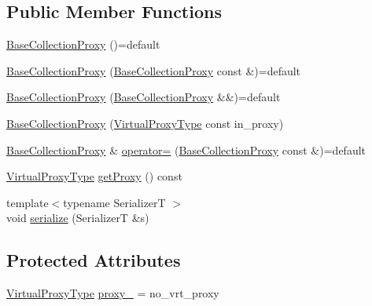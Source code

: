 \subsection*{Public Member Functions}
\begin{DoxyCompactItemize}
\item 
\hyperlink{structvt_1_1vrt_1_1collection_1_1_base_collection_proxy_ac2b876c6fb01d7e39da1ab6a50f05ba4}{Base\+Collection\+Proxy} ()=default
\item 
\hyperlink{structvt_1_1vrt_1_1collection_1_1_base_collection_proxy_a60b492b42645010e757895f5552e55df}{Base\+Collection\+Proxy} (\hyperlink{structvt_1_1vrt_1_1collection_1_1_base_collection_proxy}{Base\+Collection\+Proxy} const \&)=default
\item 
\hyperlink{structvt_1_1vrt_1_1collection_1_1_base_collection_proxy_a440dfc879237bd36076529c8da0ffca8}{Base\+Collection\+Proxy} (\hyperlink{structvt_1_1vrt_1_1collection_1_1_base_collection_proxy}{Base\+Collection\+Proxy} \&\&)=default
\item 
\hyperlink{structvt_1_1vrt_1_1collection_1_1_base_collection_proxy_a4fa854b643ae6f475adaa3e1e382f1d3}{Base\+Collection\+Proxy} (\hyperlink{namespacevt_a1b417dd5d684f045bb58a0ede70045ac}{Virtual\+Proxy\+Type} const in\+\_\+proxy)
\item 
\hyperlink{structvt_1_1vrt_1_1collection_1_1_base_collection_proxy}{Base\+Collection\+Proxy} \& \hyperlink{structvt_1_1vrt_1_1collection_1_1_base_collection_proxy_a1cdcceecdc695e35caaeb6298fb6a0bf}{operator=} (\hyperlink{structvt_1_1vrt_1_1collection_1_1_base_collection_proxy}{Base\+Collection\+Proxy} const \&)=default
\item 
\hyperlink{namespacevt_a1b417dd5d684f045bb58a0ede70045ac}{Virtual\+Proxy\+Type} \hyperlink{structvt_1_1vrt_1_1collection_1_1_base_collection_proxy_aca7569f3f6cba2bae0103da7bf3b2742}{get\+Proxy} () const
\item 
{\footnotesize template$<$typename SerializerT $>$ }\\void \hyperlink{structvt_1_1vrt_1_1collection_1_1_base_collection_proxy_afe94716260317db0d8a720c34beaa807}{serialize} (SerializerT \&s)
\end{DoxyCompactItemize}
\subsection*{Protected Attributes}
\begin{DoxyCompactItemize}
\item 
\hyperlink{namespacevt_a1b417dd5d684f045bb58a0ede70045ac}{Virtual\+Proxy\+Type} \hyperlink{structvt_1_1vrt_1_1collection_1_1_base_collection_proxy_aba04cfd81d3822ee2a2b16cb17ebf7f6}{proxy\+\_\+} = no\+\_\+vrt\+\_\+proxy
\end{DoxyCompactItemize}


